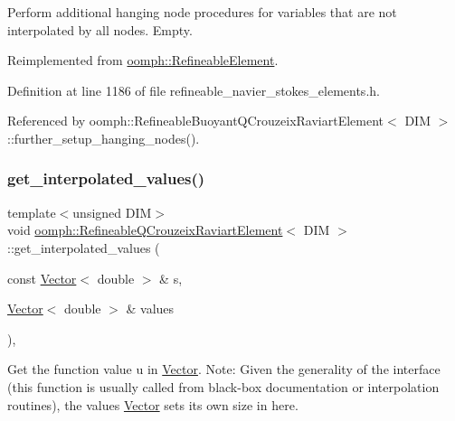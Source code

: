 Perform additional hanging node procedures for variables that are not interpolated by all nodes. Empty. 



Reimplemented from \hyperlink{classoomph_1_1RefineableElement_a86ea01c485f7ff822dce74b884312ccb}{oomph\+::\+Refineable\+Element}.



Definition at line 1186 of file refineable\+\_\+navier\+\_\+stokes\+\_\+elements.\+h.



Referenced by oomph\+::\+Refineable\+Buoyant\+Q\+Crouzeix\+Raviart\+Element$<$ D\+I\+M $>$\+::further\+\_\+setup\+\_\+hanging\+\_\+nodes().

\mbox{\label{classoomph_1_1RefineableQCrouzeixRaviartElement_a5ca5707e906ec500f23e26fa0bdc44bc}} 
\subsubsection{\texorpdfstring{get\+\_\+interpolated\+\_\+values()}{get\_interpolated\_values()}\hspace{0.1cm}{\footnotesize\ttfamily [1/2]}}
{\footnotesize\ttfamily template$<$unsigned D\+IM$>$ \\
void \hyperlink{classoomph_1_1RefineableQCrouzeixRaviartElement}{oomph\+::\+Refineable\+Q\+Crouzeix\+Raviart\+Element}$<$ D\+IM $>$\+::get\+\_\+interpolated\+\_\+values (\begin{DoxyParamCaption}\item[{const \hyperlink{classoomph_1_1Vector}{Vector}$<$ double $>$ \&}]{s,  }\item[{\hyperlink{classoomph_1_1Vector}{Vector}$<$ double $>$ \&}]{values }\end{DoxyParamCaption})\hspace{0.3cm}{\ttfamily [inline]}, {\ttfamily [virtual]}}



Get the function value u in \hyperlink{classoomph_1_1Vector}{Vector}. Note\+: Given the generality of the interface (this function is usually called from black-\/box documentation or interpolation routines), the values \hyperlink{classoomph_1_1Vector}{Vector} sets its own size in here. 



